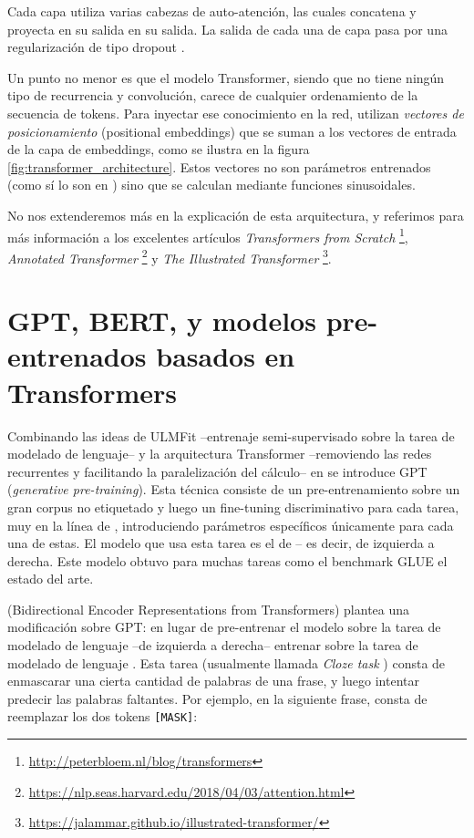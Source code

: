 Cada capa utiliza varias cabezas de auto-atención, las cuales concatena y proyecta en su salida en su salida. La salida de cada una de capa pasa por una regularización de tipo dropout \cite{srivastava2014dropout}.

Un punto no menor es que el modelo Transformer, siendo que no tiene ningún tipo de recurrencia y convolución, carece de cualquier ordenamiento de la secuencia de tokens. Para inyectar ese conocimiento en la red, utilizan \emph{vectores de posicionamiento} (positional embeddings) que se suman a los vectores de entrada de la capa de embeddings, como se ilustra en la figura \ref{fig:transformer_architecture}. Estos vectores no son parámetros entrenados (como sí lo son en \bert{}) sino que se calculan mediante funciones sinusoidales.


No nos extenderemos más en la explicación de esta arquitectura, y referimos para más información a los excelentes artículos \emph{Transformers from Scratch} \footnote{\url{http://peterbloem.nl/blog/transformers}}, \emph{Annotated Transformer} \footnote{\url{https://nlp.seas.harvard.edu/2018/04/03/attention.html}} y \emph{The Illustrated Transformer} \footnote{\url{https://jalammar.github.io/illustrated-transformer/}}.


\section{GPT, BERT, y modelos pre-entrenados basados en Transformers}

Combinando las ideas de ULMFit --entrenaje semi-supervisado sobre la tarea de modelado de lenguaje-- y la arquitectura Transformer --removiendo las redes recurrentes y facilitando la paralelización del cálculo-- en \citet{radford2018improving} se introduce GPT (\emph{generative pre-training}). Esta técnica consiste de un pre-entrenamiento sobre un gran corpus no etiquetado y luego un fine-tuning discriminativo para cada tarea, muy en la línea de \citet{howard-ruder-2018-universal}, introduciendo parámetros específicos únicamente para cada una de estas. El modelo que usa esta tarea es el de  -- es decir, de izquierda a derecha. Este modelo obtuvo para muchas tareas como el benchmark GLUE \cite{wang-etal-2018-glue} el estado del arte.


\bert{} \cite{devlin2018bert} (Bidirectional Encoder Representations from Transformers) plantea una modificación sobre GPT: en lugar de pre-entrenar el modelo sobre la tarea de modelado de lenguaje  --de izquierda a derecha-- entrenar sobre la tarea de modelado de lenguaje . Esta tarea (usualmente llamada \emph{Cloze task} \cite{taylor1953cloze}) consta de enmascarar una cierta cantidad de palabras de una frase, y luego intentar predecir las palabras faltantes. Por ejemplo, en la siguiente frase, consta de reemplazar los dos tokens \verb|[MASK]|:

